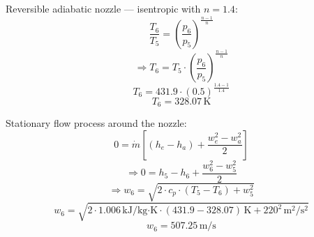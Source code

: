 Reversible adiabatic nozzle — isentropic with \( n = 1.4 \):  
\[ \frac{T_6}{T_5} = \left(\frac{p_6}{p_5}\right)^{\frac{n-1}{n}} \]  
\[ \Rightarrow T_6 = T_5 \cdot \left(\frac{p_6}{p_5}\right)^{\frac{n-1}{n}} \]  
\[ T_6 = 431.9 \cdot \left(0.5\right)^{\frac{1.4-1}{1.4}} \]  
\[ T_6 = 328.07 \, \text{K} \]  

Stationary flow process around the nozzle:  
\[ 0 = \dot{m} \left[ (h_e - h_a) + \frac{w_e^2 - w_a^2}{2} \right] \]  
\[ \Rightarrow 0 = h_5 - h_6 + \frac{w_6^2 - w_5^2}{2} \]  
\[ \Rightarrow w_6 = \sqrt{2 \cdot c_p \cdot (T_5 - T_6) + w_5^2} \]  
\[ w_6 = \sqrt{2 \cdot 1.006 \, \text{kJ/kg·K} \cdot (431.9 - 328.07) \, \text{K} + 220^2 \, \text{m}^2/\text{s}^2} \]  
\[ w_6 = 507.25 \, \text{m/s} \]